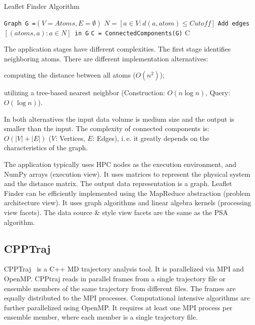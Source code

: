 \begin{algorithm}[ht]
    \scriptsize
    \caption{Leaflet Finder Algorithm}
    \label{alg:leafletfinder}
    \begin{algorithmic}[1]
        \State \texttt{Graph G =$(V=Atoms,E=\emptyset)$}
        \State \texttt{$N = [a\in V: d(a,atom)\le Cutoff]$}
        \State \texttt{Add edges $[(atoms,a): a \in N]$ in G}
        \EndFor
        \State \texttt{C = ConnectedComponents(G)}
        \State \Return C
        \EndProcedure
    \end{algorithmic}
\end{algorithm}

The application stages have different complexities.
The first stage identifies neighboring atoms.
There are different implementation alternatives: 
\begin{inparaenum}[i)]
    \item computing the distance between all atoms ($O(n^2)$);
    \item utilizing a tree-based nearest neighbor (Construction: $O(n\log n)$, 
    Query: $O(\log n)$).
\end{inparaenum}
In both alternatives the input data volume is medium size and the output is smaller than the input.
The complexity of connected components is: $O(|V|+|E|)$ ($V$: Vertices, $E$: Edges), i.\,e. it greatly depends on the characteristics of the graph.

The application typically uses HPC nodes as the execution environment, and NumPy arrays (execution view).
It uses matrices to represent the physical system and the distance matrix.
The output data representation is a graph.
Leaflet Finder can be efficiently implemented using the MapReduce abstraction (problem architecture view).
It uses graph algorithms and linear algebra kernels (processing view facets).
The data source \& style view facets are the same as the PSA algorithm.

\subsection{CPPTraj}
CPPTraj~\cite{roe2013ptraj,roe2018parallelization} is a C++ MD trajectory analysis tool.
It is parallelized via MPI and OpenMP.
CPPtraj reads in parallel frames from a single trajectory file or ensemble members of the same trajectory from different files.
The frames are equally distributed to the MPI processes.
Computational intensive algorithms are further parallelized using OpenMP.
It requires at least one MPI process per ensemble member, where each member is a single trajectory file.

